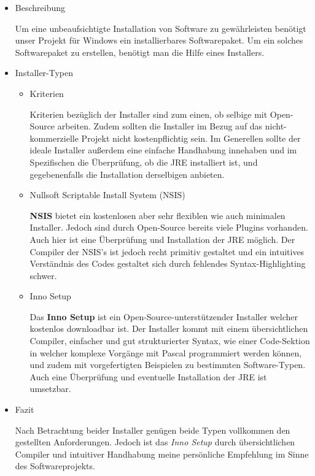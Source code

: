 
{}
	\begin{itemize}
	\item Beschreibung
	
	
	Um eine unbeaufsichtigte Installation von Software zu gewährleisten benötigt unser Projekt für Windows ein installierbares Softwarepaket. Um ein solches Softwarepaket zu erstellen, benötigt man die Hilfe eines Installers.
	
	\item Installer-Typen
	
	
    \begin{itemize}
	\item Kriterien
	
	
	Kriterien bezüglich der Installer sind zum einen, ob selbige mit Open-Source arbeiten. Zudem sollten die Installer im Bezug auf das nicht-kommerzielle Projekt nicht kostenpflichtig sein. Im Generellen sollte der ideale Installer außerdem eine einfache Handhabung innehaben und im Spezifischen die Überprüfung, ob die JRE installiert ist, und gegebenenfalls die Installation derselbigen anbieten.
	
	\item Nullsoft Scriptable Install System (NSIS)
	
	
	\textbf{NSIS} bietet ein kostenlosen aber sehr flexiblen wie auch minimalen Installer. Jedoch sind durch Open-Source bereits viele Plugins vorhanden. Auch hier ist eine Überprüfung und Installation der JRE möglich. Der Compiler der NSIS's ist jedoch recht primitiv gestaltet und ein intuitives Verständnis des Codes gestaltet sich durch fehlendes Syntax-Highlighting schwer.
	
	\item Inno Setup
	
	
	Das \textbf{Inno Setup} ist ein Open-Source-unterstützender Installer welcher kostenlos downloadbar ist. Der Installer kommt mit einem übersichtlichen Compiler, einfacher und gut strukturierter Syntax, wie einer Code-Sektion in welcher komplexe Vorgänge mit Pascal programmiert werden können, und zudem mit vorgefertigten Beispielen zu bestimmten Software-Typen. Auch eine Überprüfung und eventuelle Installation der JRE ist umsetzbar. 
	\end{itemize}
	\item Fazit
	
	
	Nach Betrachtung beider Installer genügen beide Typen vollkommen den gestellten Anforderungen. Jedoch ist das \textit{Inno Setup} durch übersichtlichen Compiler und intuitiver Handhabung meine persönliche Empfehlung im Sinne des Softwareprojekts.
	\end{itemize}

\nsecend


